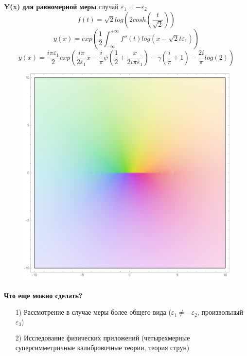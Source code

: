 \documentclass[fullscreen=true, bookmarks=false]{beamer}
\begin{document}
\begin{frame}
    {\bf Y(x) для равномерной меры}
    случай $\varepsilon_1 = -\varepsilon_2$
    \begin{equation}
    f(t) = \sqrt{2}log(2cosh(\frac{t}{\sqrt{2}}
    ))
\end{equation}
\begin{equation}
    y(x) = exp(\frac{1}{2}\int_{-\infty}^{+\infty}f''(t)log(x - \sqrt{2}t\varepsilon_1))
\end{equation}
\begin{equation}
    y(x) = \frac{i\pi\varepsilon_1}{2}exp(\frac{i\pi}{2\varepsilon_1} x-\frac{i}{\pi}\psi(\frac{1}{2}+\frac{x}{2i\pi\varepsilon_1})-\gamma(\frac{i}{\pi}+1)-\frac{2i}{\pi}log(2))
\end{equation}
\begin{figure}
\includegraphics[width=0.35\linewidth]{young_diagram_6.pdf}\\
\end{figure}
\end{frame}
\begin{frame}
{\bf Что еще можно сделать?}
\begin{enumerate}
\item[1)] Рассмотрение в случае меры более общего вида ($\varepsilon_1 \neq -\varepsilon_2$, произвольный $\varepsilon_{3}$)
\item[2)] Исследование физических приложений (четырехмерные суперсимметричные калибровочные теории, теория струн)
\end{enumerate}
\end{frame}
\end{document}
